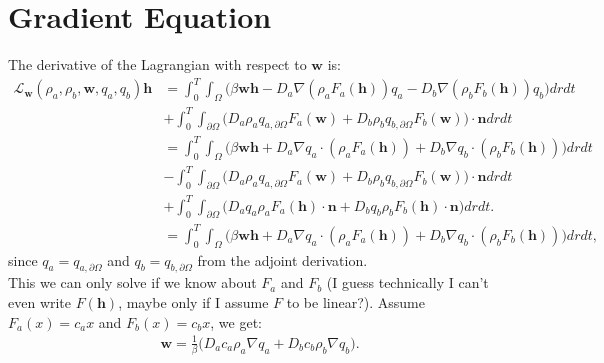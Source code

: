 \documentclass[11pt, a4paper]{article}
\theoremstyle{definition}
\newcommand{\adja}{q_a}
\newcommand{\adjb}{q_b}
\newcommand{\adjaB}{q_{a,\partial \Omega}}
\newcommand{\adjbB}{q_{b,\partial \Omega}}
\newcommand{\ra}{\rho_a}
\newcommand{\rb}{\rho_b}
\newcommand{\w}{\mathbf{w}}
\newcommand{\n}{\mathbf{n}}
\newcommand{\h}{\mathbf{h}}
\begin{document}
	\section{Gradient Equation}
	The derivative of the Lagrangian with respect to $\w$ is:
	\begin{align*}
	\mathcal{L}_{\w}(\ra,\rb, \w, \adja, \adjb) \h  &= \int_0^T \int_\Omega \bigg( \beta \w \h - D_a \nabla (\ra F_a(\h)) \adja - D_b \nabla (\rb F_b(\h)) \adjb \bigg)dr dt \\
	&+ \int_0^T \int_{\partial \Omega} \bigg( D_a \ra \adjaB F_a(\w)  + D_b \rb \adjbB F_b(\w)     \bigg) \cdot \n dr dt\\
	&= \int_0^T \int_\Omega \bigg( \beta \w \h + D_a \nabla  \adja \cdot (\ra F_a(\h)) 
	+ D_b \nabla \adjb \cdot (\rb F_b(\h)) \bigg)dr dt \\
	&- \int_0^T \int_{\partial \Omega} \bigg( D_a \ra \adjaB F_a(\w)  + D_b \rb \adjbB F_b(\w)     \bigg) \cdot \n dr dt\\
	&+ \int_0^T \int_{\partial \Omega} \bigg(D_a  \adja \ra F_a(\h) \cdot \n + D_b \adjb \rb F_b(\h) \cdot \n \bigg) dr dt.\\
	&= \int_0^T \int_\Omega \bigg( \beta \w \h + D_a \nabla  \adja \cdot (\ra F_a(\h)) 
	+ D_b \nabla \adjb \cdot (\rb F_b(\h)) \bigg)dr dt,
	\end{align*}
	since $\adja = \adjaB$ and $\adjb = \adjbB$ from the adjoint derivation.\\
	This we can only solve if we know about $F_a$ and $F_b$ (I guess technically I can't even write $F(\h)$, maybe only if I assume $F$ to be linear?). Assume $F_a(x) = c_a x$ and $F_b(x) = c_b x$, we get:
	\begin{align*}
	\w  = \frac{1}{\beta}\bigg( D_a c_a  \ra  \nabla \adja + D_b c_b \rb \nabla \adjb \bigg).
	\end{align*}	
	
	
\end{document}
